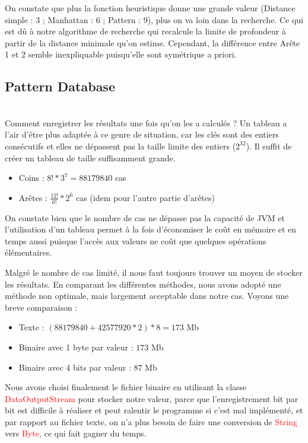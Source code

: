 \documentclass[fleqn,10pt,french]{SelfArx} %
\newcommand{\class}[1]{\colorbox{bg}{\textcolor{red}{\usefont{OT1}{cmtt}{m}{n}#1}}}
\begin{document}
\indent
On constate que plus la fonction heuristique donne une grande valeur (Distance simple : 3 ; Manhattan : 6 ; Pattern : 9), plus on va loin dans la recherche. Ce qui est dû à notre algorithme de recherche qui recalcule la limite de profondeur à partir de la distance minimale qu’on estime. Cependant, la différence entre Arête 1 et 2 semble inexpliquable puisqu’elle sont symétrique a priori.

\subsection{Pattern Database}

~\\\indent
Comment enregistrer les résultats une fois qu’on les a calculés ? Un tableau a l’air d’être plus adaptée à ce genre de situation, car les clés sont des entiers consécutifs et elles ne dépassent pas la taille limite des entiers ($2^{32}$). Il suffit de créer un tableau de taille suffisamment grande.

\begin{itemize}[noitemsep] %
\item Coins :  $8! * 3^7 = 88179840$ cas
\item Arêtes : $\frac{12!}{6!}*2^6$ cas (idem pour l’autre partie d’arêtes)
\end{itemize}

On constate bien que le nombre de cas ne dépasse pas la capacité de JVM et l’utilisation d’un tableau permet à la fois d’économiser le coût en mémoire et en temps aussi puisque l’accès aux valeurs ne coût que quelques opérations élémentaires. 

Malgré le nombre de cas limité, il nous faut toujours trouver un moyen de stocker les résultats. En comparant les différentes méthodes, nous avons adopté une méthode non optimale, mais largement acceptable dans notre cas. Voyons une breve comparaison :

\begin{itemize}[noitemsep] %
\item Texte :  $(88179840 + 42577920 * 2) * 8 = 173$ Mb
\item Binaire avec 1 byte par valeur : $173$ Mb
\item Binaire avec 4 bits par valeur : $87$ Mb
\end{itemize}

Nous avons choisi finalement le fichier binaire en utilisant la classe \class{DataOutputStream} pour stocker notre valeur, parce que l’enregistrement bit par bit est difficile à réaliser et peut ralentir le programme si c’est mal implémenté, et par rapport au fichier texte, on n’a plus besoin de faire une conversion de \class{String} vers \class{Byte}, ce qui fait gagner du temps. 
\end{document}
